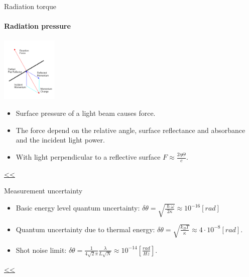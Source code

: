 \documentclass{beamer}
\begin{document}
\begin{frame}{\hypertarget{frame:Radiation torque 1}{Radiation torque}}
\framesubtitle{Radiation pressure}
	\begin{center}		
		\includegraphics[width=0.2\textwidth,keepaspectratio]{radiation.PNG}
    \end{center}

	
	\begin{itemize}		
		\item Surface pressure of a light beam causes force.
		\item The force depend on the relative angle, surface reflectance and absorbance and the incident light power.
		\item With light perpendicular to a reflective surface $F  \approx\frac{2\eta\Theta}{{c}} $.
		
	\end{itemize}
	\hyperlink{frame:Radiation torque}{<<} 
\end{frame}

\begin{frame}{\hypertarget{frame:Measurement uncertainty 1}{Measurement uncertainty}}
	\begin{itemize}
		\framesubtitle{Fundamental limits}
		\item Basic energy level quantum uncertainty: $\delta\theta= \sqrt{\frac{\hslash\omega}{2\kappa}} \approx 10^{-16} [rad]$
		\item Quantum uncertainty due to thermal energy: $\delta\theta = \sqrt{\frac{k_B T}{\kappa}} \approx 4\cdot 10^{-8} [rad]$.
		\item Shot noise limit: $\delta\theta = \frac{1}{4\sqrt{2}\pi}\frac{\lambda}{L\sqrt{N}} \approx 10^{-14} [\frac{rad}{Hz}]$.
		
	\end{itemize}
	\hyperlink{frame:Measurement uncertainty}{<<}
\end{frame}
\end{document}
